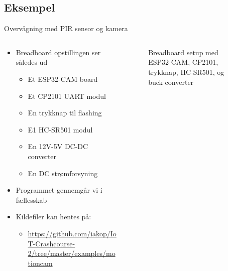 \documentclass[aspectratio=169]{beamer}
\begin{document}
\subsection{Eksempel}
\begin{frame}{Overvågning med PIR sensor og kamera}
\begin{columns}
	\begin{column}{0.5\textwidth}
		\begin{textBox}
		\begin{itemize}
			\item Breadboard opstillingen ser således ud
			\begin{itemize}
				\item Et ESP32-CAM board
				\item Et CP2101 UART modul
				\item En trykknap til flashing
				\item E1 HC-SR501 modul
				\item En 12V-5V DC-DC converter
				\item En DC strømforsyning
			\end{itemize}
			\item Programmet gennemgår vi i fællesskab
			\item Kildefiler kan hentes på:
			\begin{itemize}
				\item \tiny\url{https://github.com/iakop/IoT-Crashcourse-2/tree/master/examples/motioncam}
			\end{itemize}
		\end{itemize}
		\end{textBox}
	\end{column}
	\begin{column}{0.5\textwidth}
		\centering
		\begin{figure}
  			
  			\caption{Breadboard setup med ESP32-CAM, CP2101, trykknap, HC-SR501, og buck converter}
  			\label{fig:motioncam}
		\end{figure}
	\end{column}
\end{columns}
\end{frame}
\end{document}
